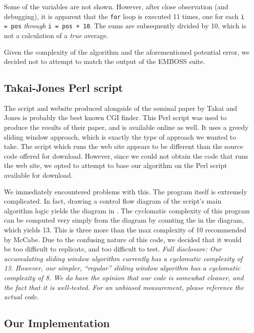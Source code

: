 \documentclass{bioinfo}
\begin{document}
Some of the variables are not shown. However, after close observation
(and debugging), it is apparent that the \verb|for| loop is executed
11 times, one for each \verb|i = pos| \emph{through}
\verb|i = pos + 10|. The sums are subsequently divided by 10, which is
not a calculation of a \emph{true} average.

Given the complexity of the algorithm and the aforementioned potential
error, we decided not to attempt to match the output of the EMBOSS
suite.

\subsection{Takai-Jones Perl script}

The script and website produced alongside of the seminal paper by
Takai and Jones is probably the best known CGI finder. This Perl
script was used to produce the results of their paper, and is
available online as well. It uses a greedy sliding window approach,
which is exactly the type of approach we wanted to take. The script
which runs the web site appears to be different than the source code
offered for download. However, since we could not obtain the code that
runs the web site, we opted to attempt to base our algorithm on the
Perl script available for download.

We immediately encountered problems with this. The program itself is
extremely complicated. In fact, drawing a control flow diagram of the
script's main algorithm logic yields the diagram in
. The cyclomatic complexity of this program
can be computed very simply from the diagram by counting the
 in the diagram, which yields 13. This
is three more than the max complexity of 10 recommended by McCabe. Due
to the confusing nature of this code, we decided that it would be too
difficult to replicate, and too difficult to test. \textit{Full
  disclosure: Our accumulating sliding window algorithm currently has
  a cyclomatic complexity of 13. However, our simpler, ``regular''
  sliding window algorithm has a cyclomatic complexity of 8. We do
  have the opinion that our code is somewhat cleaner, and the fact
  that it is well-tested. For an unbiased measurement, please
  reference the actual code.}

\subsection{Our Implementation}
\end{document}
